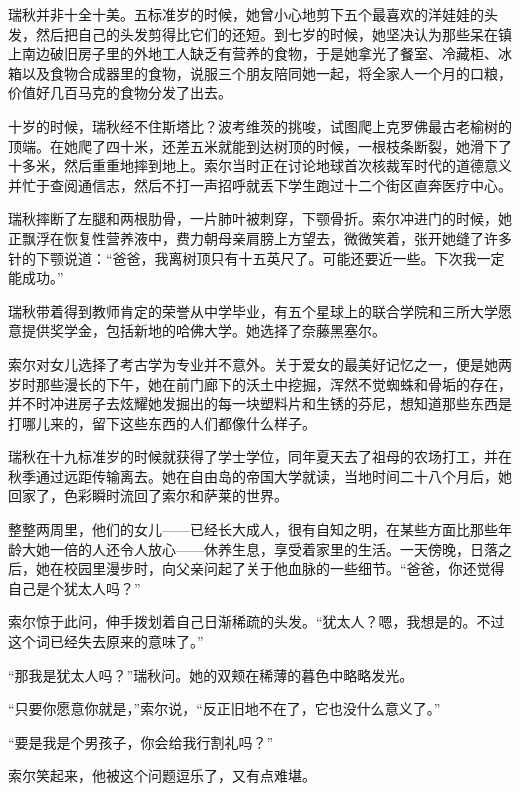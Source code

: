 \documentclass[AutoFakeBold=true]{book}
\begin{document}
\vspace*{1em}

瑞秋并非十全十美。五标准岁的时候，她曾小心地剪下五个最喜欢的洋娃娃的头发，然后把自己的头发剪得比它们的还短。到七岁的时候，她坚决认为那些呆在镇上南边破旧房子里的外地工人缺乏有营养的食物，于是她拿光了餐室、冷藏柜、冰箱以及食物合成器里的食物，说服三个朋友陪同她一起，将全家人一个月的口粮，价值好几百马克的食物分发了出去。

十岁的时候，瑞秋经不住斯塔比？波考维茨的挑唆，试图爬上克罗佛最古老榆树的顶端。在她爬了四十米，还差五米就能到达树顶的时候，一根枝条断裂，她滑下了十多米，然后重重地摔到地上。索尔当时正在讨论地球首次核裁军时代的道德意义并忙于查阅通信志，然后不打一声招呼就丢下学生跑过十二个街区直奔医疗中心。

瑞秋摔断了左腿和两根肋骨，一片肺叶被刺穿，下颚骨折。索尔冲进门的时候，她正飘浮在恢复性营养液中，费力朝母亲肩膀上方望去，微微笑着，张开她缝了许多针的下颚说道：``爸爸，我离树顶只有十五英尺了。可能还要近一些。下次我一定能成功。''

\vspace*{1em}

瑞秋带着得到教师肯定的荣誉从中学毕业，有五个星球上的联合学院和三所大学愿意提供奖学金，包括新地的哈佛大学。她选择了奈藤黑塞尔。

索尔对女儿选择了考古学为专业并不意外。关于爱女的最美好记忆之一，便是她两岁时那些漫长的下午，她在前门廊下的沃土中挖掘，浑然不觉蜘蛛和骨垢的存在，并不时冲进房子去炫耀她发掘出的每一块塑料片和生锈的芬尼，想知道那些东西是打哪儿来的，留下这些东西的人们都像什么样子。

瑞秋在十九标准岁的时候就获得了学士学位，同年夏天去了祖母的农场打工，并在秋季通过远距传输离去。她在自由岛的帝国大学就读，当地时间二十八个月后，她回家了，色彩瞬时流回了索尔和萨莱的世界。

整整两周里，他们的女儿——已经长大成人，很有自知之明，在某些方面比那些年龄大她一倍的人还令人放心——休养生息，享受着家里的生活。一天傍晚，日落之后，她在校园里漫步时，向父亲问起了关于他血脉的一些细节。``爸爸，你还觉得自己是个犹太人吗？''

索尔惊于此问，伸手拨划着自己日渐稀疏的头发。``犹太人？嗯，我想是的。不过这个词已经失去原来的意味了。''

``那我是犹太人吗？''瑞秋问。她的双颊在稀薄的暮色中略略发光。

``只要你愿意你就是，''索尔说，``反正旧地不在了，它也没什么意义了。''

``要是我是个男孩子，你会给我行割礼吗？''

索尔笑起来，他被这个问题逗乐了，又有点难堪。
\end{document}
